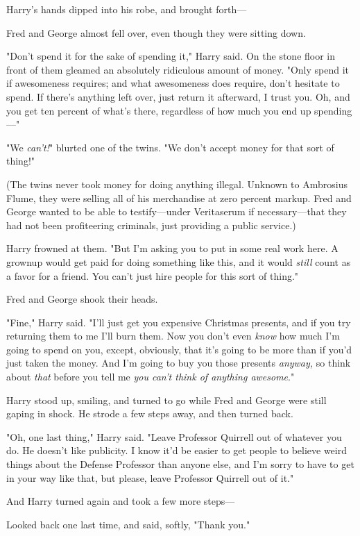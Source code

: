 Harry's hands dipped into his robe, and brought forth---

Fred and George almost fell over, even though they were sitting down.

"Don't spend it for the sake of spending it," Harry said. On the stone floor in
front of them gleamed an absolutely ridiculous amount of money. "Only spend it
if awesomeness requires; and what awesomeness does require, don't hesitate to
spend. If there's anything left over, just return it afterward, I trust you.
Oh, and you get ten percent of what's there, regardless of how much you end up
spending\mbox{---}"

"We \emph{can't!}" blurted one of the twins. "We don't accept money for that
sort of thing!"

(The twins never took money for doing anything illegal. Unknown to Ambrosius
Flume, they were selling all of his merchandise at zero percent markup. Fred
and George wanted to be able to testify---under Veritaserum if necessary---that
they had not been profiteering criminals, just providing a public service.)

Harry frowned at them. "But I'm asking you to put in some real work here. A
grownup would get paid for doing something like this, and it would \emph{still}
count as a favor for a friend. You can't just hire people for this sort of
thing."

Fred and George shook their heads.

"Fine," Harry said. "I'll just get you expensive Christmas presents, and if you
try returning them to me I'll burn them. Now you don't even \emph{know} how
much I'm going to spend on you, except, obviously, that it's going to be more
than if you'd just taken the money. And I'm going to buy you those presents
\emph{anyway,} so think about \emph{that} before you tell me \emph{you can't
think of anything awesome}."

Harry stood up, smiling, and turned to go while Fred and George were still
gaping in shock. He strode a few steps away, and then turned back.

"Oh, one last thing," Harry said. "Leave Professor Quirrell out of whatever you
do. He doesn't like publicity. I know it'd be easier to get people to believe
weird things about the Defense Professor than anyone else, and I'm sorry to
have to get in your way like that, but please, leave Professor Quirrell out of
it."

And Harry turned again and took a few more steps---

Looked back one last time, and said, softly, "Thank you."

